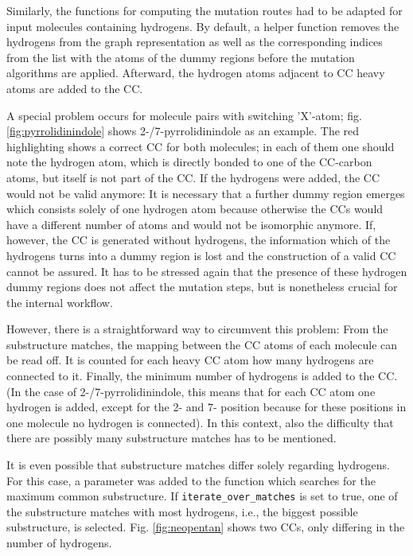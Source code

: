 Similarly, the functions for computing the mutation routes had to be adapted for input molecules containing hydrogens. By default, a helper function removes the hydrogens from the graph representation as well as the corresponding indices from the list with the atoms of the dummy regions before the mutation algorithms are applied. Afterward, the hydrogen atoms adjacent to CC heavy atoms are added to the CC.

A special problem occurs for molecule pairs with switching 'X'-atom; fig. \ref{fig:pyrrolidinindole} shows 2-/7-pyrrolidinindole as an example. The red highlighting shows a correct CC for both molecules; in each of them one should note the hydrogen atom, which is directly bonded to one of the CC-carbon atoms, but itself is not part of the CC. If the hydrogens were added, the CC would not be valid anymore: It is necessary that a further dummy region emerges which consists solely of one hydrogen atom because otherwise the CCs would have a different number of atoms and would not be isomorphic anymore. If, however, the CC is generated without hydrogens, the information which of the hydrogens turns into a dummy region is lost and the construction of a valid CC cannot be assured.
It has to be stressed again that the presence of these hydrogen dummy regions does not affect the mutation steps, but is nonetheless crucial for the internal {\trafo} workflow. 

However, there is a straightforward way to circumvent this problem: From the substructure matches, the mapping between the CC atoms of each molecule can be read off. It is counted for each heavy CC atom how many hydrogens are connected to it. Finally, the minimum number of hydrogens is added to the CC. (In the case of 2-/7-pyrrolidinindole, this means that for each CC atom one hydrogen is added, except for the 2- and 7- position because for these positions in one molecule no hydrogen is connected).
In this context, also the difficulty that there are possibly many substructure matches has to be mentioned.

It is even possible that substructure matches differ solely regarding hydrogens. For this case, a parameter was added to the function which searches for the maximum common substructure. If \texttt{iterate\_over\_matches} is set to true, one of the substructure matches with most hydrogens, i.e., the biggest possible substructure, is selected. Fig. \ref{fig:neopentan} shows two CCs, only differing in the number of hydrogens.


